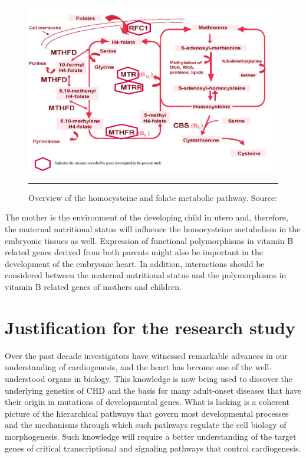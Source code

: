 \begin{refsection}
\begin{figure}[!tb]
\centering
\includegraphics[scale=1.5,keepaspectratio]{Figures/Figure1_6.pdf}
\rule{35em}{0.5pt}
\caption{Overview of the homocysteine and folate metabolic pathway. Source: \cite{fowler2001folate}}
\label{fig:1_6}
\end{figure}

The mother is the environment of the developing child in utero and, therefore, the maternal nutritional status will influence the homocysteine metabolism in the embryonic tissues as well. Expression of functional polymorphisms in vitamin B related genes derived from both parents might also be important in the development of the embryonic heart. In addition, interactions should be considered between the maternal nutritional status and the polymorphisms in vitamin B related genes of mothers and children. 

\section{Justification for the research study}

Over the past decade investigators have witnessed remarkable advances in our understanding of cardiogenesis, and the heart has become one of the well-understood organs in biology. This knowledge is now being used to discover the underlying genetics of CHD and the basis for many adult-onset diseases that have their origin in mutations of developmental genes. What is lacking is a coherent picture of the hierarchical pathways that govern most developmental processes and the mechanisms through which such pathways regulate the cell biology of morphogenesis. Such knowledge will require a better understanding of the target genes of critical transcriptional and signaling pathways that control cardiogenesis. 


\end{refsection}
